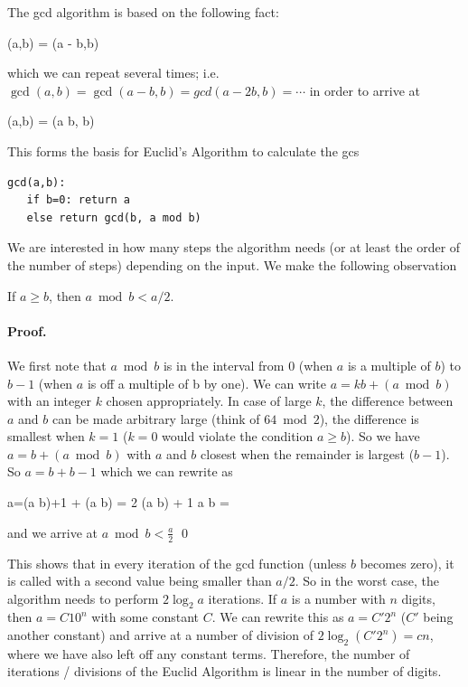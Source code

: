 
The gcd algorithm is based on the following fact:

\bee
\gcd(a,b) = \gcd(a - b,b)
\eee

which we can repeat several times; i.e. $\gcd(a,b) = \gcd(a-b,b) = gcd(a-2b,b) = \cdots$ in order to arrive at

\bee
\gcd(a,b) = \gcd(a \bmod b, b)
\eee

This forms the basis for Euclid's Algorithm to calculate the gcs

\begin{verbatim}
gcd(a,b):
   if b=0: return a
   else return gcd(b, a mod b)
\end{verbatim}

We are interested in how many steps the algorithm needs (or at least the order of the number of steps) depending on the input. We make the following observation

\begin{theorem}
If $a \geq b$, then $a \bmod b < a/2$.
\end{theorem}

\paragraph{Proof.} We first note that $a \bmod b$ is in the interval from $0$ (when $a$ is a multiple of $b$) to $b-1$ (when $a$ is off a multiple of b by one). We can write $a = kb + (a \bmod b)$ with an integer $k$ chosen appropriately. In case of large $k$, the difference between $a$ and $b$ can be made arbitrary large (think of $64 \bmod 2$), the difference is smallest when $k=1$ ($k=0$ would violate the condition $a \geq b$). So we have $a=b + (a \bmod b)$ with $a$ and $b$ closest when the remainder is largest ($b-1$). So $a = b + b-1$ which we can rewrite as 

\bee
a=(a \bmod b)+1 + (a \bmod b) = 2 (a \bmod b) + 1 \rightarrow a \bmod b = 
\eee

and we arrive at $a \bmod b < \frac{a}{2}$ \qed

This shows that in every iteration of the gcd function (unless $b$ becomes zero), it is called with a second value being smaller than $a/2$. So in the worst case, the algorithm needs to perform $2 \log_2 a$ iterations. If $a$ is a number with $n$ digits, then $a = C 10^n$ with some constant $C$. We can rewrite this as $a = C' 2^n$ ($C'$ being another constant) and arrive at a number of division of $2 \log_2 (C' 2^n) = c n$, where we have also left off any constant terms. Therefore, the number of iterations / divisions of the Euclid Algorithm is linear in the number of digits.

